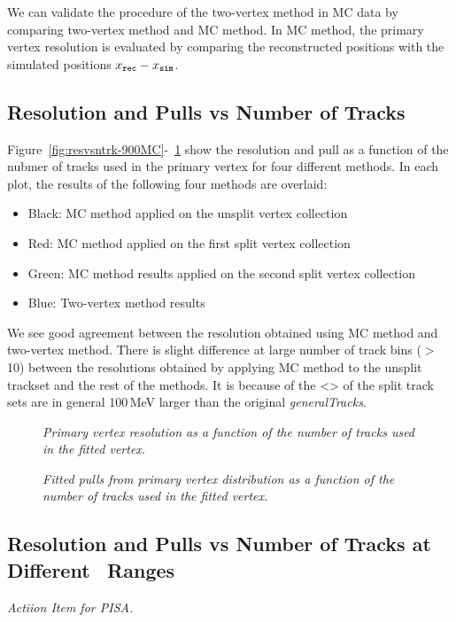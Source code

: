 
We can validate the procedure of the two-vertex method in MC data 
by comparing two-vertex method and MC method. 
In MC method, the primary vertex resolution is evaluated by 
comparing the reconstructed positions with the simulated 
positions $x_{\tt rec}-x_{\tt sim}$. 

\subsection{Resolution and Pulls vs Number of Tracks}

Figure~\ref{fig:resvsntrk-900MC}-~\ref{fig:pullvsntrk-900MC} show 
the resolution and pull as a function of the nubmer of tracks used 
in the primary vertex for four different methods. 
In each plot, the results of the following four methods are overlaid:
\begin{itemize}
\item Black: MC method applied on the unsplit vertex collection
\item Red: MC method applied on the first split vertex collection
\item Green: MC method results applied on the second split vertex collection
\item Blue: Two-vertex method results
\end{itemize}

We see good agreement between the resolution obtained using MC method and 
two-vertex method. There is slight difference at large number of track bins ($>$10) 
between the resolutions obtained by applying MC method to 
the unsplit trackset and the rest of the methods. 
It is because of the <\pt> of the split track sets are in general 
100\,MeV larger than the original {\it generalTracks}. 

\begin{figure}[htb]
\begin{center}
\centerline{
}
\caption{\sl
Primary vertex resolution as a function of the number of tracks used in the fitted vertex. 
}
\label{fig:resvsntrk-900MC}
\end{center}
\begin{center}
\centerline{
}
\caption{\sl
Fitted pulls from primary vertex distribution as a function of the number of tracks used in the 
fitted vertex.}
\label{fig:pullvsntrk-900MC}
\end{center}
\end{figure}


\subsection{Resolution and Pulls vs Number of Tracks at Different \pt\, Ranges}

{\it Actiion Item for PISA.}